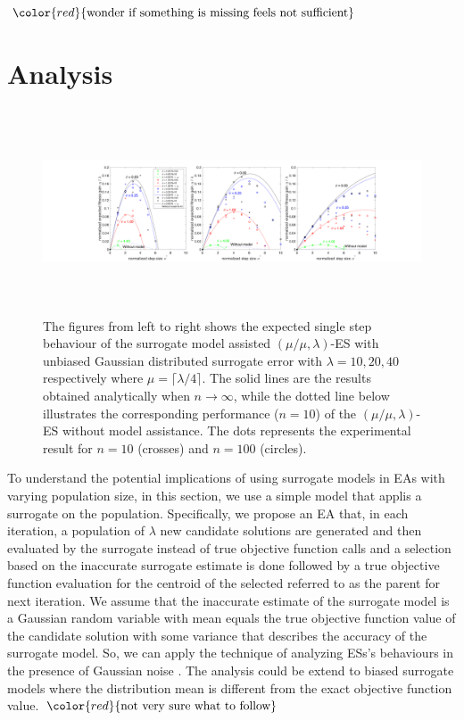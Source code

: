 $\color{red}{\text{wonder if something is missing feels not sufficient}}$



\section{Analysis}
\begin{center}
\begin{figure}
\includegraphics[height=2.4in, width=6.1in]{expectedFitGain_v1}
\caption{The figures from left to right shows the expected single step behaviour of the surrogate model assisted $(\mu/\mu,\lambda)$-ES with unbiased Gaussian distributed surrogate error with $\lambda=10,20,40$ respectively where $\mu = \lceil \lambda/4 \rceil$. The solid lines are the results obtained analytically when $n \rightarrow \infty$, while the dotted line below illustrates the corresponding performance ($n=10$) of the $(\mu/\mu,\lambda)$-ES without model assistance. The dots represents the experimental result for $n=10$ (crosses) and $n=100$ (circles).}
\label{fig:expectedFitGain}
\end{figure}
\end{center}

To understand the potential implications of using surrogate models in EAs with varying population size, in this section, we use a simple model that applis a surrogate on the population. Specifically, we propose an EA that, in each iteration, a population of $\lambda$ new candidate solutions are generated and then evaluated by the surrogate instead of true objective function calls and a selection based on the inaccurate surrogate estimate is done followed by a true objective function evaluation for the centroid of the selected referred to as the parent for next iteration. We assume that the inaccurate estimate of the surrogate model is a Gaussian random variable with mean equals the true objective function value of the candidate solution with some variance that describes the accuracy of the surrogate model. So, we can apply the technique of analyzing ESs's behaviours in the presence of Gaussian noise \cite{arnold2002noisy}. The analysis could be extend to biased surrogate models where the distribution mean is different from the exact objective function value\cite{DBLP:conf/ppsn/KayhaniA18}. $\color{red}{\text{not very sure what to follow}}$ 


